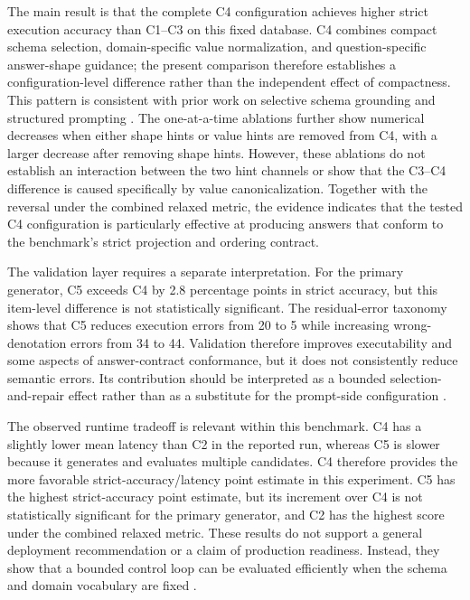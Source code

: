 \documentclass[cmc,article,submit,moreauthors,pdftex]{Definitions/tsp}
\begin{document}
The main result is that the complete C4 configuration achieves higher strict execution accuracy than C1--C3 on this fixed database. C4 combines compact schema selection, domain-specific value normalization, and question-specific answer-shape guidance; the present comparison therefore establishes a configuration-level difference rather than the independent effect of compactness. This pattern is consistent with prior work on selective schema grounding and structured prompting \cite{lei2020reexamining,liu2022semantic,quamar2022natural,xie2022unifiedskg}. The one-at-a-time ablations further show numerical decreases when either shape hints or value hints are removed from C4, with a larger decrease after removing shape hints. However, these ablations do not establish an interaction between the two hint channels or show that the C3--C4 difference is caused specifically by value canonicalization. Together with the reversal under the combined relaxed metric, the evidence indicates that the tested C4 configuration is particularly effective at producing answers that conform to the benchmark's strict projection and ordering contract.

The validation layer requires a separate interpretation. For the primary generator, C5 exceeds C4 by 2.8 percentage points in strict accuracy, but this item-level difference is not statistically significant. The residual-error taxonomy shows that C5 reduces execution errors from 20 to 5 while increasing wrong-denotation errors from 34 to 44. Validation therefore improves executability and some aspects of answer-contract conformance, but it does not consistently reduce semantic errors. Its contribution should be interpreted as a bounded selection-and-repair effect rather than as a substitute for the prompt-side configuration \cite{wang2021executions,li2024select,huang2024survey}.

The observed runtime tradeoff is relevant within this benchmark. C4 has a slightly lower mean latency than C2 in the reported run, whereas C5 is slower because it generates and evaluates multiple candidates. C4 therefore provides the more favorable strict-accuracy/latency point estimate in this experiment. C5 has the highest strict-accuracy point estimate, but its increment over C4 is not statistically significant for the primary generator, and C2 has the highest score under the combined relaxed metric. These results do not support a general deployment recommendation or a claim of production readiness. Instead, they show that a bounded control loop can be evaluated efficiently when the schema and domain vocabulary are fixed \cite{wang2023macsql,pourreza2024chasesql}.
\end{document}
